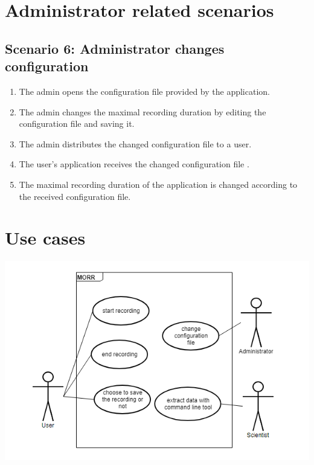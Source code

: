 \section{Administrator related scenarios}
\subsection{Scenario 6: Administrator changes configuration}
\begin{enumerate}
    \item The \gls{admin} opens the configuration file provided by the application.
    \item The \gls{admin} changes the maximal recording duration \see[OC10] by editing the configuration file and saving it.
    \item The \gls{admin} distributes the changed configuration file to a \gls{user}.
    \item The \gls{user}'s application receives the changed configuration file .
    \item The maximal recording duration \see[OC10] of the application is changed according to the received configuration file.
\end{enumerate}

\section{Use cases}
\begin{center}
\includegraphics[scale=0.9]{resources/usecase.png}
\end{center}